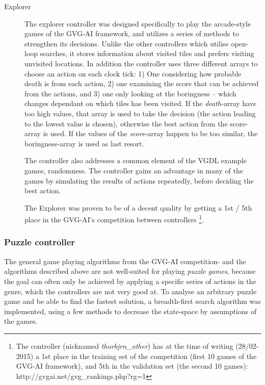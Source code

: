 \documentclass[a4paper,titlepage,final]{report}
\begin{document}
\begin{description}
\item[Explorer]
The explorer controller was designed specifically to play the arcade-style games of the GVG-AI framework, and utilizes a series of methods to strengthen its decisions. 
Unlike the other controllers which utilise open-loop searches, it stores information about visited tiles and prefers visiting unvisited locations. 
In addition the controller uses three different arrays to choose an action on each clock tick: 
1) One considering how probable death is from each action, 2) one examining the score that can be achieved from the actions, and 3) one only looking at the boringness -- which changes dependant on which tiles has been visited.
If the \textit{death}-array have too high values, that array is used to take the decision (the action leading to the lowest value is chosen), otherwise the best action from the score-array is used.
If the values of the \textit{score}-array happen to be too similar, the boringness-array is used as last resort.

The controller also addresses a common element of the VGDL example games, randomness. The controller gains an advantage in many of the games by simulating the results of actions repeatedly, before deciding the best action.

The Explorer was proven to be of a decent quality by getting a 1st / 5th place in the GVG-AI's competition between controllers \footnote{The controller (nicknamed \textit{thorbjrn_other}) has at the time of writing (28/02-2015) a 1st place in the training set of the competition (first 10 games of the GVG-AI framework), and 5th in the validation set (the second 10 games): http://gvgai.net/gvg_rankings.php?rg=1}.
\end{description}



\subsubsection*{Puzzle controller}
The general game playing algorithms from the GVG-AI competition- and the algorithms described above are not well-suited for playing \emph{puzzle games}, because the goal can often only be achieved by applying a specific series of actions in the genre, which the controllers are not very good at.
To analyse an arbitrary puzzle game and be able to find the fastest solution, a breadth-first search algorithm was implemented, using a few methods to decrease the state-space by assumptions of the games.
\end{document}

